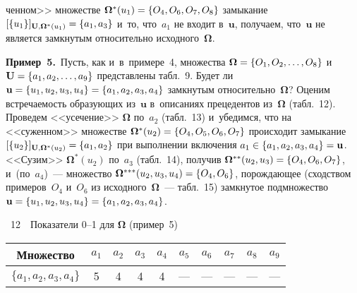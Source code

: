 \begin{multicols}{2}
\vspace*{12pt}


\noindent
ченном>> множестве ${\boldsymbol{\Omega}}^*(u_1)\hm = \{O_4, O_6, 
O_7, O_8\}$ замыкание $[\{u_1\}]_{\mathbf{U},{\boldsymbol{\Omega}}^*(u_1)}\hm = \{a_1, a_3\}$ 
и~то, что~$a_1$ не входит в~$\mathbf{u}$, получаем, что~$\mathbf{u}$ 
не является замкнутым относительно исходного~${\boldsymbol{\Omega}}$.
     
     \smallskip
     
     \noindent
     \textbf{Пример~5.}\ Пусть, как и~в~примере~4, множества 
${\boldsymbol{\Omega}}\hm= \{O_1, O_2, \ldots, O_8\}$ и~$\mathbf{U}\hm=\{a_1, a_2, \ldots, 
a_9\}$ представлены табл.~9. Будет ли $\mathbf{u}\hm= \{u_1, u_2, u_3, 
u_4\}\hm=\{a_1, a_2, a_3, a_4\}$ замкнутым относительно~${\boldsymbol{\Omega}}$? Оценим 
встречаемость образующих из~$\mathbf{u}$ в~описаниях прецедентов 
из~${\boldsymbol{\Omega}}$ (табл.~12). Проведем <<усечение>> ${\boldsymbol{\Omega}}$ по~$a_2$ 
(табл.~13) и~убедимся, что на <<сужен\-ном>> множестве ${\boldsymbol{\Omega}}^*(u_2)\hm= 
\{O_4, O_5, O_6, O_7\}$ происходит замыкание 
$[\{u_2\}]_{\mathbf{U},{\boldsymbol{\Omega}}^*(u_2)}\hm = \{a_1, 
a_2\}$ при выполнении включения $a_1\hm\in\{a_1, a_2, a_3, a_4\} \hm= 
\mathbf{u}$. <<Сузим>> ${\boldsymbol{\Omega}}^*(u_2)$ по~$a_3$ (табл.~14), получив 
${\boldsymbol{\Omega}}^{**}(u_2,u_3)\hm=\{O_4, O_6, O_7\}$, и~(по~$a_4$)~--- множество 
${\boldsymbol{\Omega}}^{***}(u_2, u_3, u_4)\hm = \{O_4, O_6\}$, порождающее (сходством 
примеров~$O_4$ и~$O_6$ из исходного~${\boldsymbol{\Omega}}$~--- табл.~15) замкнутое 
подмножество $\mathbf{u}\hm = \{u_1, u_2, u_3, u_4\}\hm = \{a_1, a_2, a_3, 
a_4\}$.
     
\vspace*{6pt}

\noindent
{\small
 \begin{center}  %
{{\tablename~12}\ \ \small{Показатели 0--1 для ${\boldsymbol{\Omega}}$ (пример~5)}}

\vspace*{2ex}

\tabcolsep=4pt
      \begin{tabular}{|c|c|c|c|c|c|c|c|c|c|}
\hline
Множество&$a_1$&\cellcolor[gray]{.6}$a_2$&$a_3$&$a_4$&$a_5$&$a_6$&$a_7$&$a_8$&$a_9$\\
\hline
$\{a_1,a_2,a_3,a_4\}$&5&\cellcolor[gray]{.6}4&4&4&---&---&---&---&---\\
\hline
\end{tabular}
\end{center}
}



\end{multicols}
